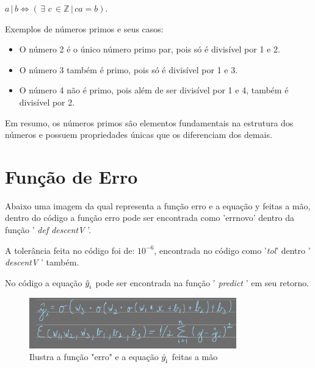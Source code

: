 \documentclass{article}
\begin{document}
$a\,|\,b \Leftrightarrow (\,\exists\, \,c\, \in \mathbb{Z} \,|\, ca = b)$.

\begin{flushleft}
Exemplos de números primos e seus casos:
\end{flushleft}
\begin{itemize}
  \item O número 2 é o único número primo par, pois só é divisível por 1 e 2.
  \item O número 3 também é primo, pois só é divisível por 1 e 3.
  \item O número 4 não é primo, pois além de ser divisível por 1 e 4, também é divisível por 2.
\end{itemize}

\begin{flushleft}
Em resumo, os números primos são elementos fundamentais na estrutura dos números e possuem propriedades únicas que os diferenciam dos demais.
\end{flushleft}

\newpage

\section{Função de Erro}
\begin{flushleft}
Abaixo uma imagem da qual representa a função erro e a equação y feitas a mão, dentro do código a função erro pode ser encontrada como 'errnovo' dentro da função '\textit{ def descentV }'.
\end{flushleft}

\begin{flushleft}
A tolerância feita no código foi de: $10^{-6}$, encontrada no código como '\textit{tol}' dentro '\textit{ descentV }' também.
\end{flushleft}

\begin{flushleft}
No código a equação $\hat{y}_\textsubscript{i}$ pode ser encontrada na função '\textit{ predict }' em seu retorno.
\end{flushleft}

\begin{figure}[htbp]
    \centering
    \includegraphics[width=0.8\textwidth]{Funcao_Erro e Funcao y.png}
    \caption{Ilustra a função "erro" e a equação $\hat{y}_\textsubscript{i}$ feitas a mão}
    \label{fig:funcao_erro1}
\end{figure}
\end{document}
